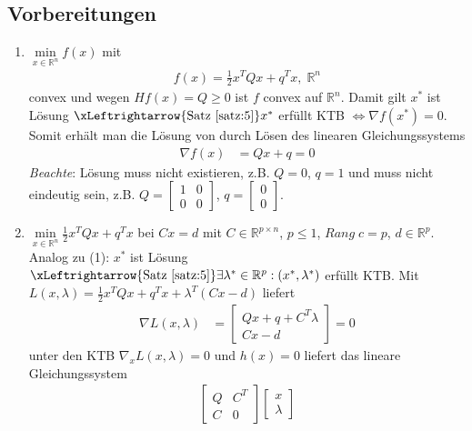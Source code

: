 \subsection{Vorbereitungen}
\begin{enumerate}[label=(\arabic*)]
  \item $\min\limits_{x\in\mathbb{R}^n}f(x)$ mit 
  \begin{align}
  	f(x)=\frac12 x^TQx+q^Tx,\; \mathbb{R}^n		\label{eqn:kap_1_quadprog_vor_1}
  \end{align}
  convex und wegen $H f(x)=Q\ge 0$ ist $f$ convex auf $\mathbb{R}^n$. Damit gilt $x^{\ast}$ ist Lösung
  $\xLeftrightarrow{\text{Satz \ref{satz:5}}} x^{\ast}$ erfüllt \ac{KTB} $\Leftrightarrow\nabla f(x^{\ast})=0$. Somit erhält man die Lösung von  durch
  Lösen des linearen Gleichungssystems
  \begin{align*}
  	\nabla f(x) & = Qx+q =0
  \end{align*} 
  \textit{Beachte}: Lösung muss nicht existieren, z.B. $Q = 0$, $q = 1$ und muss nicht eindeutig sein, z.B. $Q = \begin{bmatrix}
  1	& 0\\ 0	& 0 \end{bmatrix}$, $q = \begin{bmatrix} 0 \\ 0 \end{bmatrix}$.
  \item $\min\limits_{x\in\mathbb{R}^n}\frac12 x^TQx+q^Tx$ bei $Cx=d$ mit $C\in\mathbb{R}^{p\times n}$, $p \le 1$, $Rang\; c = p$, $d\in\mathbb{R}^p$. Analog zu (1): $x^{\ast}$ ist Lösung
  $\xLeftrightarrow{\text{Satz \ref{satz:5}}}\exists\lambda^{\ast}\in\mathbb{R}^p:(x^{\ast},\lambda^{\ast})$ erfüllt \ac{KTB}. Mit $L(x,\lambda)=\frac12
  x^TQx+q^Tx+\lambda^T(Cx-d)$ liefert
  \begin{align*}
  \nabla L(x,\lambda) & = \begin{bmatrix}
  Qx+q+C^T\lambda \\
  Cx-d
  \end{bmatrix} = 0
  \end{align*} 
  unter den \ac{KTB} $\nabla_xL(x,\lambda)=0$ und $h(x)=0$ liefert das lineare Gleichungssystem
  \begin{align*}
  \begin{bmatrix}
  Q	& C^T\\ C	& 0 
  \end{bmatrix}\begin{bmatrix}
  x\\ \lambda

\end{bmatrix}
\end{align*}
\end{enumerate}
